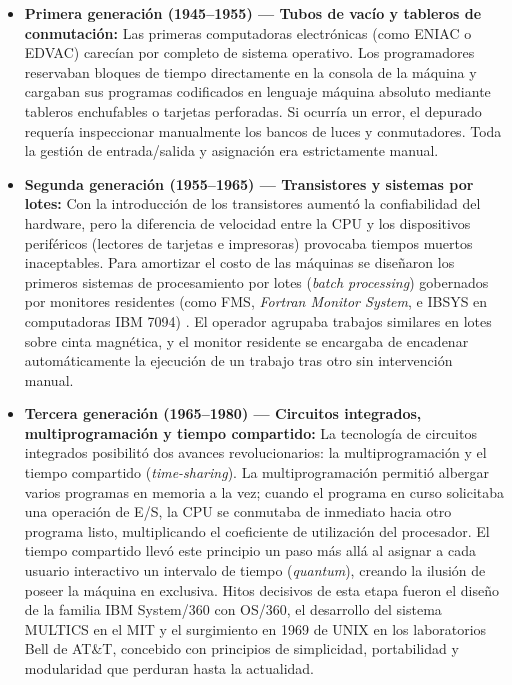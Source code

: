 \documentclass[12pt]{article}
\begin{document}
\begin{itemize}[leftmargin=*]
    \item \textbf{Primera generación (1945--1955) --- Tubos de vacío y tableros de conmutación:} Las primeras computadoras electrónicas (como ENIAC o EDVAC) carecían por completo de sistema operativo. Los programadores reservaban bloques de tiempo directamente en la consola de la máquina y cargaban sus programas codificados en lenguaje máquina absoluto mediante tableros enchufables o tarjetas perforadas. Si ocurría un error, el depurado requería inspeccionar manualmente los bancos de luces y conmutadores. Toda la gestión de entrada/salida y asignación era estrictamente manual.
    \item \textbf{Segunda generación (1955--1965) --- Transistores y sistemas por lotes:} Con la introducción de los transistores aumentó la confiabilidad del hardware, pero la diferencia de velocidad entre la CPU y los dispositivos periféricos (lectores de tarjetas e impresoras) provocaba tiempos muertos inaceptables. Para amortizar el costo de las máquinas se diseñaron los primeros sistemas de procesamiento por lotes (\textit{batch processing}) gobernados por monitores residentes (como FMS, \textit{Fortran Monitor System}, e IBSYS en computadoras IBM 7094) \parencite[\S 2.2, p.\ 72]{stallings2018operating}. El operador agrupaba trabajos similares en lotes sobre cinta magnética, y el monitor residente se encargaba de encadenar automáticamente la ejecución de un trabajo tras otro sin intervención manual.
    \item \textbf{Tercera generación (1965--1980) --- Circuitos integrados, multiprogramación y tiempo compartido:} La tecnología de circuitos integrados posibilitó dos avances revolucionarios: la multiprogramación y el tiempo compartido (\textit{time-sharing}). La multiprogramación permitió albergar varios programas en memoria a la vez; cuando el programa en curso solicitaba una operación de E/S, la CPU se conmutaba de inmediato hacia otro programa listo, multiplicando el coeficiente de utilización del procesador. El tiempo compartido llevó este principio un paso más allá al asignar a cada usuario interactivo un intervalo de tiempo (\textit{quantum}), creando la ilusión de poseer la máquina en exclusiva. Hitos decisivos de esta etapa fueron el diseño de la familia IBM System/360 con OS/360, el desarrollo del sistema MULTICS en el MIT y el surgimiento en 1969 de UNIX en los laboratorios Bell de AT\&T, concebido con principios de simplicidad, portabilidad y modularidad que perduran hasta la actualidad.

\end{itemize}
\end{document}
